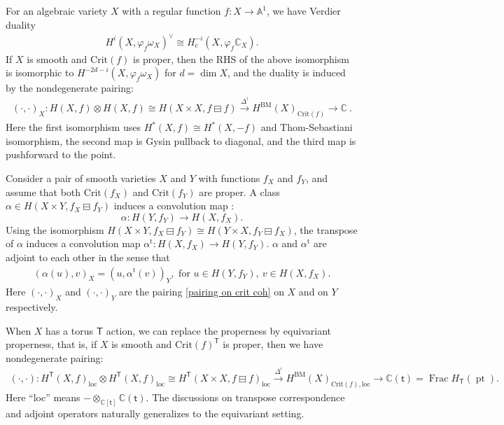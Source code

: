 \documentclass[10pt]{amsart}
\theoremstyle{definition}
\numberwithin{equation}{section}
\newcommand{\bA}{\mathbb{A}}
\newcommand{\Crit}{\mathrm{Crit}}
\newcommand{\bC}{\mathbb{C}}
\newcommand{\loc}{\mathrm{loc}}
\newcommand{\sT}{\mathsf{T}}
\newcommand{\Frac}{\operatorname{Frac}}
\newcommand{\pt}{\operatorname{pt}}
\begin{document}
For an algebraic variety $X$ with a regular function $f\colon X\to \bA^1$, we have Verdier duality
\begin{align*}
    H^{i}(X,\varphi_{f}\omega_X)^{\vee}\cong H^{-i}_c(X,\varphi_{f}\bC_X).
\end{align*}
If $X$ is smooth and $\Crit(f)$ is proper, then the RHS of the above isomorphism is isomorphic to $H^{-2d-i}(X,\varphi_{f}\omega_X)$ for $d=\dim X$, and the duality is induced by the nondegenerate pairing:
\begin{align}\label{pairing on crit coh}
(\cdot,\cdot)_X:
H(X,f)\otimes H(X,f)\cong H(X\times X,f\boxminus f)\xrightarrow{\Delta^!} H^{\mathrm{BM}}(X)_{\Crit(f)}\to \bC\:.
\end{align}
Here the first isomorphism uses $H^{*}(X,f)\cong H^{*}(X,-f)$ and Thom-Sebastiani isomorphism, the second map is Gysin pullback to diagonal, and the third map is pushforward to the point. 

Consider a pair of smooth varieties $X$ and $Y$ with functions $f_X$ and $f_Y$, and assume that both $\Crit(f_X)$ and $\Crit(f_Y)$ are proper. A class $\alpha\in H(X\times Y,f_X\boxminus f_Y)$ induces a convolution map \cite[(3.3)]{COZZ}: 
$$\alpha\colon H(Y,f_Y)\to H(X,f_X). $$ 
Using the isomorphism $H(X\times Y,f_X\boxminus f_Y)\cong H(Y\times X,f_Y\boxminus f_X)$, the transpose of $\alpha$ induces a convolution map $\alpha^{\mathrm{t}}\colon H(X,f_X)\to H(Y,f_Y)$. $\alpha$ and $\alpha^{\mathrm{t}}$ are adjoint to each other in the sense that
\begin{align*}
    (\alpha (u),v)_X=(u,\alpha^{\mathrm{t}}(v))_Y, \text{ for }u\in H(Y,f_Y), \: v\in H(X,f_X).
\end{align*}
Here $(\cdot,\cdot)_X$ and $(\cdot,\cdot)_Y$ are the pairing \eqref{pairing on crit coh} on $X$ and on $Y$ respectively.

When $X$ has a torus $\sT$ action, we can replace the properness by equivariant properness, that is, if $X$ is smooth and $\Crit(f)^{\sT}$ is proper, then we have nondegenerate pairing:
\begin{align}\label{pairing on eq crit coh}
  (\cdot,\cdot)\colon  H^\sT(X,f)_{\loc}\otimes H^\sT(X,f)_\loc\cong H^\sT(X\times X,f\boxminus f)_\loc\xrightarrow{\Delta^!} H^{\mathrm{BM}}(X)_{\Crit(f),\loc}\to \bC(\mathsf t)=\Frac H_\sT(\pt).
\end{align}
Here ``loc'' means $-\otimes_{\bC[\mathsf t]}\bC(\mathsf t)$. The discussions on transpose correspondence and adjoint operators naturally generalizes to the equivariant setting.
\end{document}
